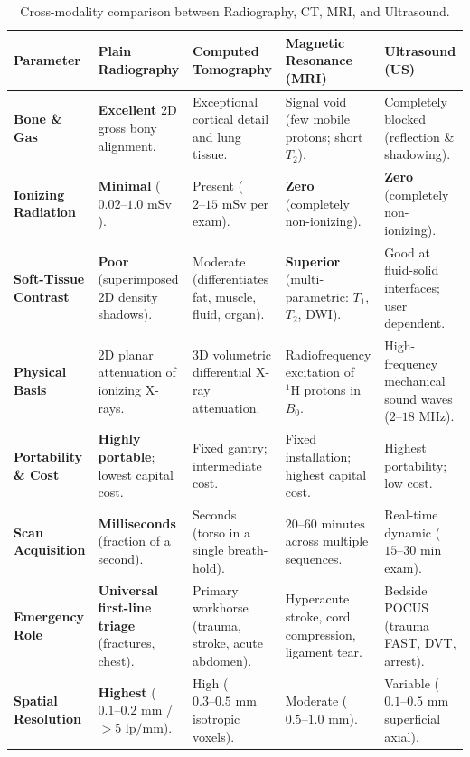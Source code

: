 \documentclass[11pt,a4paper]{article}
\begin{document}
\begin{table}[htbp]
\centering
\small
\setlength{\tabcolsep}{3pt}
\renewcommand{\arraystretch}{1.25}
\begin{tabular}{p{2.2cm}p{2.8cm}p{3.2cm}p{3.2cm}p{3.0cm}}
\toprule
\textbf{Parameter} & \textbf{Plain Radiography} & \textbf{Computed Tomography} & \textbf{Magnetic Resonance (MRI)} & \textbf{Ultrasound (US)} \\
\midrule
\textbf{Bone \& Gas} & \textbf{Excellent} 2D gross bony alignment. & Exceptional cortical detail and lung tissue. & Signal void (few mobile protons; short $T_2$). & Completely blocked (reflection \& shadowing). \\
\textbf{Ionizing Radiation} & \textbf{Minimal} ($0.02\text{--}1.0\text{ mSv}$). & Present ($2\text{--}15\text{ mSv}$ per exam). & \textbf{Zero} (completely non-ionizing). & \textbf{Zero} (completely non-ionizing). \\
\textbf{Soft-Tissue Contrast} & \textbf{Poor} (superimposed 2D density shadows). & Moderate (differentiates fat, muscle, fluid, organ). & \textbf{Superior} (multi-parametric: $T_1$, $T_2$, DWI). & Good at fluid-solid interfaces; user dependent. \\
\textbf{Physical Basis} & 2D planar attenuation of ionizing X-rays. & 3D volumetric differential X-ray attenuation. & Radiofrequency excitation of $^1\text{H}$ protons in $B_0$. & High-frequency mechanical sound waves ($2\text{--}18\text{ MHz}$). \\
\textbf{Portability \& Cost} & \textbf{Highly portable}; lowest capital cost. & Fixed gantry; intermediate cost. & Fixed installation; highest capital cost. & Highest portability; low cost. \\
\textbf{Scan Acquisition} & \textbf{Milliseconds} (fraction of a second). & Seconds (torso in a single breath-hold). & $20\text{--}60\text{ minutes}$ across multiple sequences. & Real-time dynamic ($15\text{--}30\text{ min}$ exam). \\
\textbf{Emergency Role} & \textbf{Universal first-line triage} (fractures, chest). & Primary workhorse (trauma, stroke, acute abdomen). & Hyperacute stroke, cord compression, ligament tear. & Bedside POCUS (trauma FAST, DVT, arrest). \\
\textbf{Spatial Resolution} & \textbf{Highest} ($0.1\text{--}0.2\text{ mm}$ / $>5\text{ lp/mm}$). & High ($0.3\text{--}0.5\text{ mm}$ isotropic voxels). & Moderate ($0.5\text{--}1.0\text{ mm}$). & Variable ($0.1\text{--}0.5\text{ mm}$ superficial axial). \\
\bottomrule
\end{tabular}
\caption{Cross-modality comparison between Radiography, CT, MRI, and Ultrasound.}
\label{tab:modality_comparison}
\end{table}
\end{document}
